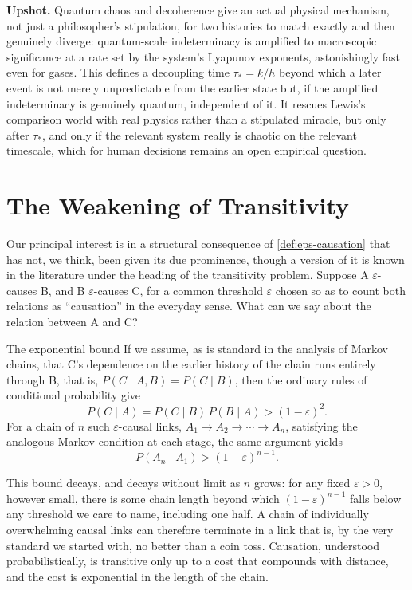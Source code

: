 \documentclass[11pt]{article}
\theoremstyle{definition}
\newcommand{\upshot}[1]{\par\smallskip\noindent\textbf{Upshot.} #1\par\smallskip}
\newcommand{\eps}{\varepsilon}
\begin{document}
\upshot{Quantum chaos and decoherence give an actual physical mechanism, not just a philosopher's stipulation, for two histories to match exactly and then genuinely diverge: quantum-scale indeterminacy is amplified to macroscopic significance at a rate set by the system's Lyapunov exponents, astonishingly fast even for gases. This defines a decoupling time $\tau_*=k/h$ beyond which a later event is not merely unpredictable from the earlier state but, if the amplified indeterminacy is genuinely quantum, independent of it. It rescues Lewis's comparison world with real physics rather than a stipulated miracle, but only after $\tau_*$, and only if the relevant system really is chaotic on the relevant timescale, which for human decisions remains an open empirical question.}

\section{The Weakening of Transitivity}
\label{sec:trans}

Our principal interest is in a structural consequence of \cref{def:eps-causation} that has not, we think, been given its due prominence, though a version of it is known in the literature under the heading of the transitivity problem. Suppose A $\eps$-causes B, and B $\eps$-causes C, for a common threshold $\eps$ chosen so as to count both relations as ``causation'' in the everyday sense. What can we say about the relation between A and C?

\begin{techbox}{The exponential bound}
If we assume, as is standard in the analysis of Markov chains, that C's dependence on the earlier history of the chain runs entirely through B, that is, $P(C \mid A, B) = P(C \mid B)$, then the ordinary rules of conditional probability give
\[
P(C \mid A) = P(C \mid B)\, P(B \mid A) > (1-\eps)^2 .
\]
For a chain of $n$ such $\eps$-causal links, $A_1 \to A_2 \to \cdots \to A_n$, satisfying the analogous Markov condition at each stage, the same argument yields
\begin{equation}
P(A_n \mid A_1) > (1-\eps)^{n-1}. \label{eq:decay}
\end{equation}
\end{techbox}

This bound decays, and decays without limit as $n$ grows: for any fixed $\eps > 0$, however small, there is some chain length beyond which $(1-\eps)^{n-1}$ falls below any threshold we care to name, including one half. A chain of individually overwhelming causal links can therefore terminate in a link that is, by the very standard we started with, no better than a coin toss. Causation, understood probabilistically, is transitive only up to a cost that compounds with distance, and the cost is exponential in the length of the chain.
\end{document}
